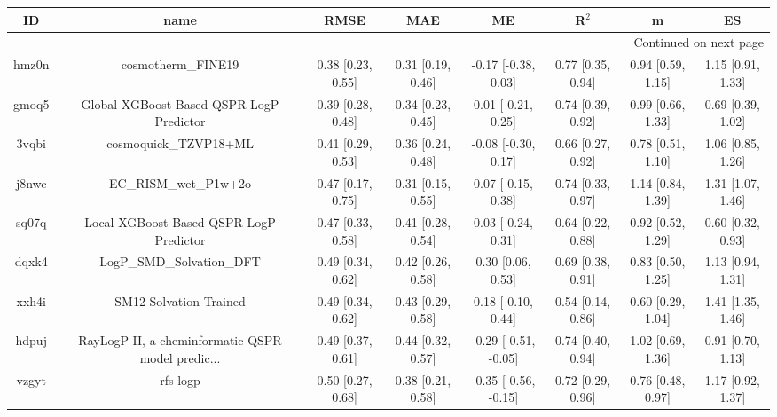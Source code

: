 \documentclass{article}
\begin{document}
\begin{center}
\begin{longtable}{|cccccccc|}
\toprule
    ID &                                               name &               RMSE &                MAE &                    ME &              R$^2$ &                    m &                    ES \\
\midrule
\endhead
\midrule
\multicolumn{8}{r}{{Continued on next page}} \\
\midrule
\endfoot

\bottomrule
\endlastfoot
 hmz0n &                                 cosmotherm\_FINE19 &  0.38 [0.23, 0.55] &  0.31 [0.19, 0.46] &   -0.17 [-0.38, 0.03] &  0.77 [0.35, 0.94] &    0.94 [0.59, 1.15] &     1.15 [0.91, 1.33] \\
 gmoq5 &           Global XGBoost-Based QSPR LogP Predictor &  0.39 [0.28, 0.48] &  0.34 [0.23, 0.45] &    0.01 [-0.21, 0.25] &  0.74 [0.39, 0.92] &    0.99 [0.66, 1.33] &     0.69 [0.39, 1.02] \\
 3vqbi &                              cosmoquick\_TZVP18+ML &  0.41 [0.29, 0.53] &  0.36 [0.24, 0.48] &   -0.08 [-0.30, 0.17] &  0.66 [0.27, 0.92] &    0.78 [0.51, 1.10] &     1.06 [0.85, 1.26] \\
 j8nwc &                              EC\_RISM\_wet\_P1w+2o &  0.47 [0.17, 0.75] &  0.31 [0.15, 0.55] &    0.07 [-0.15, 0.38] &  0.74 [0.33, 0.97] &    1.14 [0.84, 1.39] &     1.31 [1.07, 1.46] \\
 sq07q &            Local XGBoost-Based QSPR LogP Predictor &  0.47 [0.33, 0.58] &  0.41 [0.28, 0.54] &    0.03 [-0.24, 0.31] &  0.64 [0.22, 0.88] &    0.92 [0.52, 1.29] &     0.60 [0.32, 0.93] \\
 dqxk4 &                          LogP\_SMD\_Solvation\_DFT &  0.49 [0.34, 0.62] &  0.42 [0.26, 0.58] &     0.30 [0.06, 0.53] &  0.69 [0.38, 0.91] &    0.83 [0.50, 1.25] &     1.13 [0.94, 1.31] \\
 xxh4i &                             SM12-Solvation-Trained &  0.49 [0.34, 0.62] &  0.43 [0.29, 0.58] &    0.18 [-0.10, 0.44] &  0.54 [0.14, 0.86] &    0.60 [0.29, 1.04] &     1.41 [1.35, 1.46] \\
 hdpuj &  RayLogP-II, a cheminformatic QSPR model predic... &  0.49 [0.37, 0.61] &  0.44 [0.32, 0.57] &  -0.29 [-0.51, -0.05] &  0.74 [0.40, 0.94] &    1.02 [0.69, 1.36] &     0.91 [0.70, 1.13] \\
 vzgyt &                                           rfs-logp &  0.50 [0.27, 0.68] &  0.38 [0.21, 0.58] &  -0.35 [-0.56, -0.15] &  0.72 [0.29, 0.96] &    0.76 [0.48, 0.97] &     1.17 [0.92, 1.37] \\

\end{longtable}
\end{center}
\end{document}
